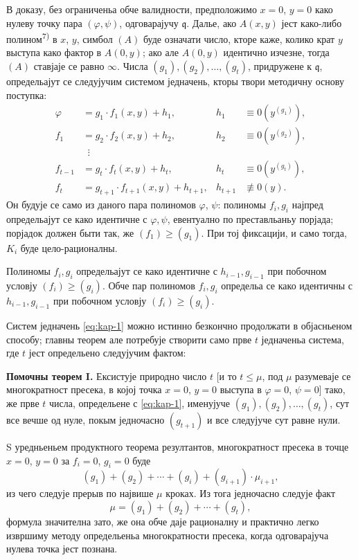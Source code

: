 \documentclass[11pt]{article}
\theoremstyle{plain}
\begin{document}
В доказу, без ограниченьа обче валидности, предположимо $x = 0$,
$y = 0$ како нулеву точку пара $(\varphi, \psi)$, одговарајучу
$\mathfrak{q}$. Далье, ако $A(x,y)$ јест како-либо полином\textsuperscript{7)}
в $x$, $y$, симбол $(A)$ буде означати число, кторе каже, колико
крат $y$ выступа како фактор в $A(0,y)$; ако але $A(0,y)$
идентично изчезне, тогда $(A)$ ставјаје се равно $\infty$. Числа
$(g_{1}), (g_{2}), \ldots, (g_{t})$, придружене к $\mathfrak{q}$,
определьајут се следујучим системом једначень, кторы твори
методичну основу поступка:
\begin{equation}\label{eq:kap-1}
\begin{aligned}
\varphi &= g_{1} \cdot f_{1}(x,y) + h_{1}, & h_{1} &\equiv 0(y^{(g_{1})}),\\
f_{1} &= g_{2} \cdot f_{2}(x,y) + h_{2}, & h_{2} &\equiv 0(y^{(g_{2})}),\\
&\;\;\vdots &&\\
f_{t-1} &= g_{t} \cdot f_{t}(x,y) + h_{t}, & h_{t} &\equiv 0(y^{(g_{t})}),\\
f_{t} &= g_{t+1} \cdot f_{t+1}(x,y) + h_{t+1}, & h_{t+1} &\not\equiv 0(y).
\end{aligned}
\end{equation}
Он будује се само из даного пара полиномов $\varphi$, $\psi$:
полиномы $f_{i}, g_{i}$ најпред определьајут се како идентичне с
$\varphi, \psi$, евентуално по преставльаньу порјада; порјадок
должен быти так, же $(f_{1}) \geq (g_{1})$. При тој фиксацији, и
само тогда, $K_{i}$ буде цело-рационалны.

Полиномы $f_{i}, g_{i}$ определьајут се како идентичне с
$h_{i-1}, g_{i-1}$ при побочном условју $(f_{i}) \geq (g_{i})$.
Обче пар полиномов $f_{i}, g_{i}$ определьа се како идентичны с
$h_{i-1}, g_{i-1}$ при побочном условју $(f_{i}) \geq (g_{i})$.

Систем једначень \eqref{eq:kap-1} можно истинно безкончно
продолжати в објасньеном способу; главны теорем але потребује
створити само прве $t$ једначеньа система, где $t$ јест определьено
следујучим фактом:

\smallskip
\textbf{Помочны теорем I.} Ексистује природно число $t$ [и то
$t \leq \mu$, под $\mu$ разумеваје се многократност пресека, в којој
точка $x = 0$, $y = 0$ выступа в $\varphi = 0$, $\psi = 0$] тако, же
прве $t$ числа, определьене с \eqref{eq:kap-1}, именујуче
$(g_{1}), (g_{2}), \ldots, (g_{t})$, сут все вечше од нуле, покым
једночасно $(g_{t+1})$ и все следујуче сут равне нули.

S уредньеньем продуктного теорема резултантов, многократност
пресека в точце $x = 0$, $y = 0$ за $f_{i} = 0$, $g_{i} = 0$ буде
\[
(g_{1}) + (g_{2}) + \cdots + (g_{i}) + (g_{i+1}) \cdot \mu_{i+1},
\]
из чего следује прерыв по највише $\mu$ кроках. Из тога једночасно
следује факт
\begin{equation}\label{eq:kap-2}
\mu = (g_{1}) + (g_{2}) + \cdots + (g_{t}),
\end{equation}
формула значителна зато, же она обче даје рационалну и практично
легко извршиму методу определьеньа многократности пресека, когда
одговарајуча нулева точка јест познана.
\end{document}
